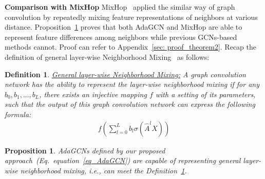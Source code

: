 \documentclass{article} \usepackage{iclr2021_conference,times}
\def\eqref#1{equation~\ref{#1}}
\newtheorem{defn}{Definition}
\newtheorem{prop}{Proposition}
\begin{document}
\textbf{Comparison with MixHop} MixHop~\citep{abu2019mixhop} applied the similar way of graph convolution by repeatedly mixing feature representations of neighbors at various distance. Proposition~\ref{theorem:mixhop} proves that both AdaGCN and MixHop are able to represent feature differences among neighbors while previous GCNs-based methods cannot. Proof can refer to Appendix~\ref{sec: proof_theorem2}. Recap the definition of general layer-wise Neighborhood Mixing~\citep{abu2019mixhop} as follows:
\begin{defn}{\underline{General layer-wise Neighborhood Mixing:}}
	\label{defn:mixhop}
	A graph convolution network has the ability to represent the layer-wise neighborhood mixing if for any $b_0, b_1, ..., b_L$, there exists an injective mapping $f$ with a setting of its parameters, such that the output of this graph convolution network can express the following formula:
	\begin{equation}  
	\label{eq_MixHop}
	\begin{aligned} 
	f\left(\sum_{l=0}^{L} b_{l} \sigma\left(\hat{A}^{l} X\right)\right)
	\end{aligned} 
	\end{equation}
\end{defn}

\begin{prop}\label{theorem:mixhop}
	AdaGCNs defined by our proposed approach~(Eq.~\eqref{eq_AdaGCN}) are capable of representing general layer-wise neighborhood mixing, i.e., can meet the Definition~\ref{defn:mixhop}.
\end{prop}
\end{document}
